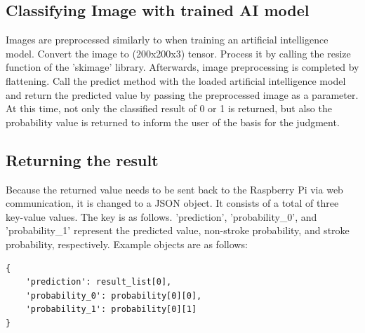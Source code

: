 \subsection{\textbf{Classifying Image with trained AI model}}
Images are preprocessed similarly to when training an artificial intelligence model. Convert the image to (200x200x3) tensor. Process it by calling the resize function of the 'skimage' library. Afterwards, image preprocessing is completed by flattening. Call the predict method with the loaded artificial intelligence model and return the predicted value by passing the preprocessed image as a parameter. At this time, not only the classified result of 0 or 1 is returned, but also the probability value is returned to inform the user of the basis for the judgment.\\

\subsection{\textbf{Returning the result}}
Because the returned value needs to be sent back to the Raspberry Pi via web communication, it is changed to a JSON object. It consists of a total of three key-value values. The key is as follows. 'prediction', 'probability\_0', and 'probability\_1' represent the predicted value, non-stroke probability, and stroke probability, respectively. Example objects are as follows:
\begin{verbatim}
{
    'prediction': result_list[0],
    'probability_0': probability[0][0],
    'probability_1': probability[0][1]
}
\end{verbatim}
\\


